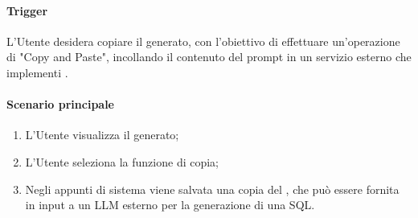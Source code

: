 \paragraph*{Trigger}
L'Utente desidera copiare il  generato, con l'obiettivo di effettuare un'operazione di "Copy and Paste", incollando il contenuto del prompt in un servizio esterno che implementi .

\paragraph*{Scenario principale}
\begin{enumerate}
  \item L'Utente visualizza il  generato;
  \item L'Utente seleziona la funzione di copia;
  \item Negli appunti di sistema viene salvata una copia del , che può essere fornita in input a un LLM esterno per la generazione di una  SQL.
\end{enumerate}